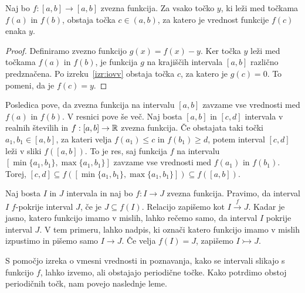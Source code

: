 \documentclass[../TG_magistrsko_delo_sections.tex]{subfiles}
\begin{document}
\begin{posledica}\label{pos:vmesnavrednost}
Naj bo $f : [a, b] \to [a, b]$ zvezna funkcija. Za vsako točko $y$, ki leži med točkama $f(a)$ in $f(b)$, obstaja točka $c \in (a, b)$, za katero je vrednost funkcije $f(c)$ enaka $y$.
\end{posledica}
\begin{proof}
Definiramo zvezno funkcijo $g(x) = f(x) - y$. Ker točka $y$ leži med točkama $f(a)$ in $f(b)$, je funkcija $g$ na krajiščih intervala $[a, b]$ različno predznačena. Po izreku~\ref{izr:iovv} obstaja točka $c$, za katero je $g(c) = 0$. To pomeni, da je $f(c) = y$.
\end{proof}
Posledica pove, da zvezna funkcija na intervalu $[a, b]$ zavzame vse vrednosti med $f(a)$ in $f(b)$. V resnici pove še več. Naj bosta $[a, b]$ in $[c, d]$ intervala v realnih številih in $f : [a, b] \to \mathbb R$ zvezna funkcija. Če obstajata taki točki $a_1, b_1 \in [a, b]$, za kateri velja $f(a_1) \leq c$ in $f(b_1) \geq d$, potem interval $[c, d]$ leži v sliki $f([a, b])$. To je res, saj funkcija $f$ na intervalu $[\min\{a_1, b_1\}, \max\{a_1, b_1\}]$ zavzame vse vrednosti med $f(a_1)$ in $f(b_1)$. Torej, $[c, d] \subseteq f([\min\{a_1, b_1\}, \max\{a_1, b_1\}]) \subseteq f([a, b])$.

\begin{definicija}\label{def:pokritja}
Naj bosta $I$ in $J$ intervala in naj bo $f : I \to J$ zvezna funkcija. Pravimo, da interval $I$ $f$-pokrije interval $J$, če je $J \subseteq f(I)$. Relacijo zapišemo kot $I \xrightarrow{f} J$. Kadar je jasno, katero funkcijo imamo v mislih, lahko rečemo samo, da interval $I$ pokrije interval $J$. V tem primeru, lahko nadpis, ki označi katero funkcijo imamo v mislih izpustimo in pišemo samo $I \to J$. Če velja $f(I) =J$, zapišemo $I \rightarrowtail J$.
\end{definicija}
S pomočjo izreka o vmesni vrednosti in poznavanja, kako se intervali slikajo s funkcijo $f$, lahko izvemo, ali obstajajo periodične točke. Kako potrdimo obstoj periodičnih točk, nam povejo naslednje leme.
\end{document}
